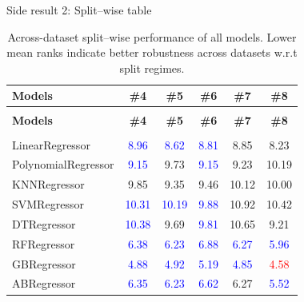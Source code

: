\begin{frame}{Side result 2: Split–wise table}
    \tiny
    \begin{longtable}{lccccc}
    \caption{Across-dataset split–wise performance of all models. Lower mean ranks indicate better robustness across datasets w.r.t split regimes.}
    \label{tab:split_wise_rank_another} \\
    \toprule
    \textbf{Models} &
    \textbf{\#4} &
    \textbf{\#5} &
    \textbf{\#6} &
    \textbf{\#7} &
    \textbf{\#8} \\
    \midrule
    \endfirsthead

    \multicolumn{5}{c}{} \\
    \toprule
    \textbf{Models} &
    \textbf{\#4} &
    \textbf{\#5} &
    \textbf{\#6} &
    \textbf{\#7} &
    \textbf{\#8} \\
    \midrule
    \endhead

    \midrule
    \multicolumn{5}{r}{} \\
    \endfoot

    \bottomrule
    \endlastfoot

    LinearRegressor & \textcolor{blue}{8.96} & \textcolor{blue}{8.62} & \textcolor{blue}{8.81} & 8.85 & 8.23 \\

    PolynomialRegressor & \textcolor{blue}{9.15} & 9.73 & \textcolor{blue}{9.15} & 9.23 & 10.19 \\

    KNNRegressor & 9.85 & 9.35 & 9.46 & 10.12 & 10.00 \\

    SVMRegressor & \textcolor{blue}{10.31} & \textcolor{blue}{10.19} & \textcolor{blue}{9.88} & 10.92 & 10.42 \\

    DTRegressor & \textcolor{blue}{10.38} & 9.69 & \textcolor{blue}{9.81} & 10.65 & 9.21 \\

    RFRegressor & \textcolor{blue}{6.38} & \textcolor{blue}{6.23} & \textcolor{blue}{6.88} & \textcolor{blue}{6.27} & \textcolor{blue}{5.96} \\

    GBRegressor & \textcolor{blue}{4.88} & \textcolor{blue}{4.92} & \textcolor{blue}{5.19} & \textcolor{blue}{4.85} & \textcolor{red}{4.58} \\

    ABRegressor & \textcolor{blue}{6.35} & \textcolor{blue}{6.23} & \textcolor{blue}{6.62} & 6.27 & \textcolor{blue}{5.52} \\


\end{longtable}
\end{frame}
